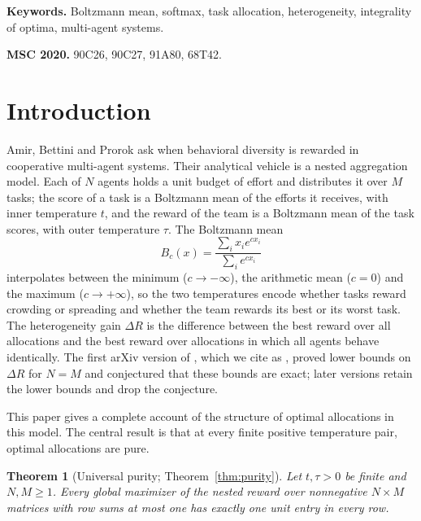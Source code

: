 \documentclass[11pt]{article}
\theoremstyle{plain}
\newtheorem{theorem}{Theorem}[section]
\theoremstyle{definition}
\theoremstyle{remark}
\begin{document}
\noindent\textbf{Keywords.} Boltzmann mean, softmax, task allocation, heterogeneity, integrality of optima, multi-agent systems.

\noindent\textbf{MSC 2020.} 90C26, 90C27, 91A80, 68T42.

\section{Introduction}\label{sec:intro}

Amir, Bettini and Prorok \cite{ABPv4} ask when behavioral diversity is rewarded in cooperative multi-agent systems. Their analytical vehicle is a nested aggregation model. Each of $N$ agents holds a unit budget of effort and distributes it over $M$ tasks; the score of a task is a Boltzmann mean of the efforts it receives, with inner temperature $t$, and the reward of the team is a Boltzmann mean of the task scores, with outer temperature $\tau$. The Boltzmann mean
\begin{equation}\label{eq:boltz}
 B_c(x)=\frac{\sum_i x_i e^{c x_i}}{\sum_i e^{c x_i}}
\end{equation}
interpolates between the minimum ($c\to-\infty$), the arithmetic mean ($c=0$) and the maximum ($c\to+\infty$), so the two temperatures encode whether tasks reward crowding or spreading and whether the team rewards its best or its worst task. The heterogeneity gain $\Delta R$ is the difference between the best reward over all allocations and the best reward over allocations in which all agents behave identically. The first arXiv version of \cite{ABPv4}, which we cite as \cite{ABPv1}, proved lower bounds on $\Delta R$ for $N=M$ and conjectured that these bounds are exact; later versions retain the lower bounds and drop the conjecture.

This paper gives a complete account of the structure of optimal allocations in this model. The central result is that at every finite positive temperature pair, optimal allocations are pure.

\begin{theorem}[Universal purity; Theorem~\ref{thm:purity}]
Let $t,\tau>0$ be finite and $N,M\ge 1$. Every global maximizer of the nested reward over nonnegative $N\times M$ matrices with row sums at most one has exactly one unit entry in every row.
\end{theorem}
\end{document}
